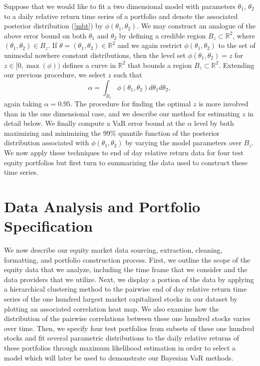 \documentclass{amsart}
\begin{document}
Suppose that we would like to fit a two dimensional model with parameters $\theta_1$, $\theta_2$
to a daily relative return time series of a portfolio and denote the associated posterior distribution 
(\ref{mbt}) by $\phi(\theta_1,\theta_2)$.
We may construct an analogue of the above error bound on both $\theta_1$ and $\theta_2$ by 
defining a credible region $B_z\subset\mathbb{R}^2$, where $(\theta_1,\theta_2)\in B_z$.
If $\theta=(\theta_1,\theta_2)\in\mathbb{R}^2$ and we again restrict $\phi(\theta_1,\theta_2)$
to the set of unimodal nowhere constant distributions, then 
the level set $\phi(\theta_1,\theta_2)=z$ for $z\in[0,\max(\phi))$ defines a curve in 
$\mathbb{R}^2$ that bounds a region $B_z\subset\mathbb{R}^2$. 
Extending our previous procedure, we select $z$ such that 
%
\begin{equation}
    \alpha = \int_{B_z} \phi(\theta_1,\theta_2)d\theta_1d\theta_2,
\end{equation}
%
again taking $\alpha=0.95$. The procedure for finding 
the optimal $z$ is more involved than in the one dimensional case, and we describe 
our method for estimating $z$ in detail below. We finally compute a 
VaR error bound at the $\alpha$ level by both maximizing and minimizing the 99\% quantile function of the 
posterior distribution associated with $\phi(\theta_1,\theta_2)$ 
by varying the model parameters over $B_z$.
We now apply these techniques to end of day relative return data for four test equity portfolios 
but first turn to summarizing the data used to construct these time series.

\section{Data Analysis and Portfolio Specification}

We now describe our equity market data sourcing, extraction, cleaning, formatting, 
and portfolio construction process. 
First, we outline the scope of the equity data that we analyze, 
including the time frame that we consider and the data providers that we utilize.
Next, we display a portion of the data by applying a hierarchical clustering method to the 
pairwise end of day relative return time series of the one hundred largest 
market capitalized stocks in our dataset by  
plotting an associated correlation heat map.  We also examine
how the distribution of the pairwise correlations between these one hundred stocks
varies over time. 
Then, we specify four test portfolios from subsets of these one hundred 
stocks and fit several parametric distributions to the daily relative returns of these 
portfolios through maximum likelihood estimation in order to select a model which  
will later be used to demonstrate our Bayesian VaR methods.
\end{document}
